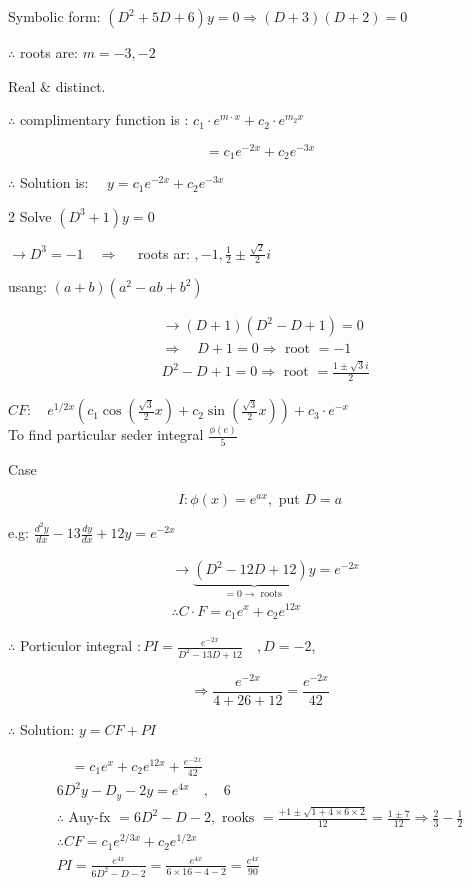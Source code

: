 \documentclass[12pt, a4paper]{article}
\begin{document}
Symbolic form: $\left(D^{2}+5 D+6\right) y=0 \Rightarrow(D+3)(D+2)=0$

$\therefore$ roots are: $m=-3,-2$

Real \& distinct.

$\therefore$ complimentary function is : $c_{1} \cdot e^{m \cdot x}+c_{2} \cdot e^{m_{2} x}$

$$
=c_{1} e^{-2 x}+c_{2} e^{-3 x}
$$

$\therefore$ Solution is: $\quad y=c_{1} e^{-2 x}+c_{2} e^{-3 x}$

2 Solve $\left(D^{3}+1\right) y=0$

$\rightarrow D^{3}=-1 \quad \Rightarrow \quad$ roots ar: $,-1, \frac{1}{2} \pm \frac{\sqrt{2}}{2} i$

usang: $(a+b)\left(a^{2}-a b+b^{2}\right)$

$$
\begin{aligned}
& \rightarrow(D+1)\left(D^{2}-D+1\right)=0 \\
& \Rightarrow \quad D+1=0 \Rightarrow \text { root }=-1 \\
& D^{2}-D+1=0 \Rightarrow \text { root }=\frac{1 \pm \sqrt{3} i}{2}
\end{aligned}
$$

$C F: \quad e^{1 / 2 x}\left(c_{1} \cos \left(\frac{\sqrt{3}}{2} x\right)+c_{2} \sin \left(\frac{\sqrt{3}}{2} x\right)\right)+c_{3} \cdot e^{-x}$\\
To find particular seder integral $\frac{\phi(e)}{5}$

Case

$$
I: \phi(x)=e^{a x}, \text { put } D=a
$$

e.g: $\frac{d^{2} y}{d x}-13 \frac{d y}{d x}+12 y=e^{-2 x}$

$$
\begin{aligned}
& \rightarrow \underbrace{\left(D^{2}-12 D+12\right) y}_{=0 \rightarrow \text { roots }}=e^{-2 x} \\
& \therefore C \cdot F=c_{1} e^{x}+c_{2} e^{12 x}
\end{aligned}
$$

$\therefore$ Porticulor integral $: P I=\frac{e^{-2 x}}{D^{2}-13 D+12} \quad, D=-2$,

$$
\Rightarrow \frac{e^{-2 x}}{4+26+12}=\frac{e^{-2 x}}{42}
$$

$\therefore$ Solution: $y=C F+P I$

$$
\begin{gathered}
\quad=c_{1} e^{x}+c_{2} e^{12 x}+\frac{e^{-2 x}}{42} \\
6 D^{2} y-D_{y}-2 y=e^{4 x} \quad, \quad 6 \\
\therefore \text { Auy-fx }=6 D^{2}-D-2, \text { rooks }=\frac{+1 \pm \sqrt{1+4 \times 6 \times 2}}{12}=\frac{1 \pm 7}{12} \Rightarrow \frac{2}{3}-\frac{1}{2} \\
\therefore C F=c_{1} e^{2 / 3 x}+c_{2} e^{1 / 2 x} \\
P I=\frac{e^{4 x}}{6 D^{2}-D-2}=\frac{e^{4 x}}{6 \times 16-4-2}=\frac{e^{4 x}}{90}
\end{gathered}
$$
\end{document}
